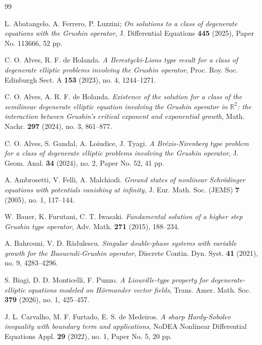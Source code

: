 \documentclass[12pt]{amsart}
\begin{document}
\begin{thebibliography}{99}
	
L. Abatangelo, A. Ferrero, P. Luzzini; \textit{On solutions to a class of degenerate equations with the Grushin operator}, J. Differential Equations {\bf 445} (2025), Paper No. 113666, 52 pp.



C. O. Alves, R. F. de Holanda.
\textit{A Berestycki-Lions type result for a class of degenerate elliptic problems involving the Grushin operator},
Proc. Roy. Soc. Edinburgh Sect. A {\bf 153} (2023), no. 4, 1244--1271.

C. O. Alves, A. R. F. de Holanda.
\textit{Existence of the solution for a class of the semilinear degenerate elliptic equation involving the Grushin operator in $\mathbb R^2$: the interaction between Grushin's critical exponent and exponential growth},
Math. Nachr. {\bf 297} (2024), no. 3, 861--877.

C. O. Alves, S. Gandal, A. Loiudice, J. Tyagi.
\textit{A Br\'ezis-Nirenberg type problem for a class of degenerate elliptic problems involving the Grushin operator},
J. Geom. Anal. {\bf 34} (2024), no. 2, Paper No. 52, 41 pp.

A. Ambrosetti, V. Felli, A. Malchiodi.
\textit{Ground states of nonlinear Schr\"odinger equations with potentials vanishing at infinity},
J. Eur. Math. Soc. (JEMS) {\bf 7} (2005), no. 1, 117--144.

W. Bauer, K. Furutani, C. T. Iwasaki.
\textit{Fundamental solution of a higher step Grushin type operator},
Adv. Math. {\bf 271} (2015), 188--234.

A. Bahrouni, V. D. R\u adulescu.
\textit{Singular double-phase systems with variable growth for the Baouendi-Grushin operator},
Discrete Contin. Dyn. Syst. {\bf 41} (2021), no. 9, 4283--4296.

S. Biagi, D. D. Monticelli, F. Punzo.
\textit{A Liouville-type property for degenerate-elliptic equations modeled on H\"ormander vector fields},
Trans. Amer. Math. Soc. {\bf 379} (2026), no. 1, 425--457.

J. L. Carvalho, M. F. Furtado, E. S. de Medeiros.
\textit{A sharp Hardy-Sobolev inequality with boundary term and applications},
NoDEA Nonlinear Differential Equations Appl. {\bf 29} (2022), no. 1, Paper No. 5, 20 pp.


\end{thebibliography}
\end{document}
